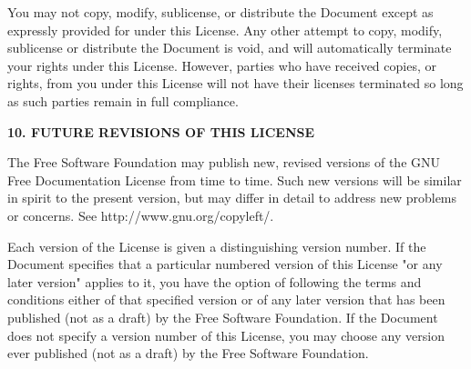 \documentclass[a4paper,11pt]{article}
\begin{document}
You may not copy, modify, sublicense, or distribute the Document except
as expressly provided for under this License.  Any other attempt to
copy, modify, sublicense or distribute the Document is void, and will
automatically terminate your rights under this License.  However,
parties who have received copies, or rights, from you under this
License will not have their licenses terminated so long as such
parties remain in full compliance.


\begin{center}
{\Large\bf 10. FUTURE REVISIONS OF THIS LICENSE}
\end{center}


The Free Software Foundation may publish new, revised versions
of the GNU Free Documentation License from time to time.  Such new
versions will be similar in spirit to the present version, but may
differ in detail to address new problems or concerns.  See
http://www.gnu.org/copyleft/.

Each version of the License is given a distinguishing version number.
If the Document specifies that a particular numbered version of this
License "or any later version" applies to it, you have the option of
following the terms and conditions either of that specified version or
of any later version that has been published (not as a draft) by the
Free Software Foundation.  If the Document does not specify a version
number of this License, you may choose any version ever published (not
as a draft) by the Free Software Foundation.


\end{document}
